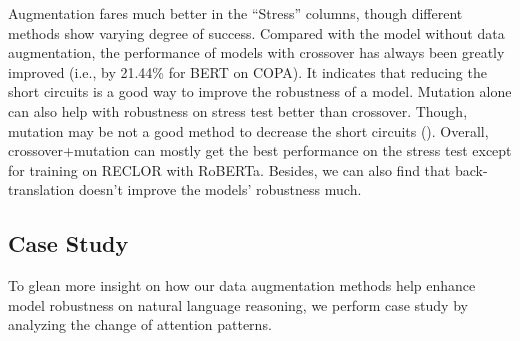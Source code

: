 Augmentation fares much better in the ``Stress'' columns, though
different methods show varying degree of success.
Compared with the model without data augmentation, 
the performance of models with crossover 
has always been greatly improved (i.e., by 21.44\% for BERT on COPA).
It indicates that reducing the short circuits 
is a good way to improve the robustness of a model.
Mutation alone can also help with robustness on stress test better than crossover.
Though, mutation may be not a 
good method to decrease the short circuits (). 
Overall, crossover+mutation 
can mostly get the best performance on the stress test except for 
training on RECLOR with RoBERTa. 
Besides, we can also find that back-translation doesn't improve the models' robustness much.




\subsection{Case Study}
\label{sec:case}
To glean more insight on how our data augmentation methods help enhance model robustness on natural language reasoning, we perform case study by analyzing the change of attention patterns.

